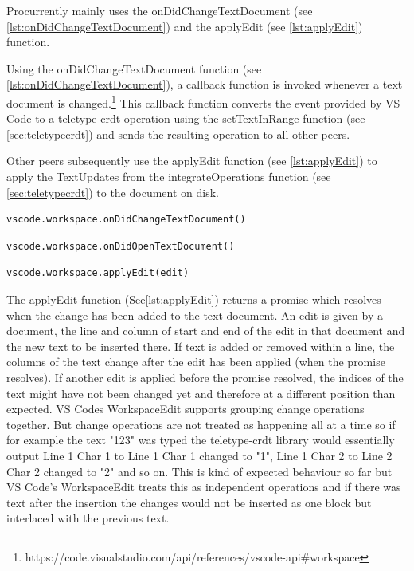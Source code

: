 Procurrently mainly uses the onDidChangeTextDocument (see \autoref{lst:onDidChangeTextDocument}) and the applyEdit (see \autoref{lst:applyEdit}) function. 

Using the onDidChangeTextDocument function (see \autoref{lst:onDidChangeTextDocument}), a callback function is invoked whenever a text document is changed.\footnote{https://code.visualstudio.com/api/references/vscode-api\#workspace} This callback function converts the event provided by VS Code to a teletype-crdt operation using the setTextInRange function (see \autoref{sec:teletypecrdt}) and sends the resulting operation to all other peers.

Other peers subsequently use the applyEdit function (see \autoref{lst:applyEdit}) to apply the TextUpdates from the integrateOperations function (see \autoref{sec:teletypecrdt}) to the document on disk.

\begin{lstlisting}[label={lst:onDidChangeTextDocument}, caption=VS Code API onDidChangeTextDocument]
vscode.workspace.onDidChangeTextDocument()
\end{lstlisting}

\begin{lstlisting}[label={lst:onDidOpenTextDocument}, caption=VS Code API onDidOpenTextDocument]
vscode.workspace.onDidOpenTextDocument()
\end{lstlisting}

\begin{lstlisting}[label={lst:applyEdit}, caption=VS Code API applyEdit]
vscode.workspace.applyEdit(edit)
\end{lstlisting}

The applyEdit function (See\autoref{lst:applyEdit}) returns a promise which resolves when the change has been added to the text document.
An edit is given by a document, the line and column of start and end of the edit in that document and the new text to be inserted there.
If text is added or removed within a line, the columns of the text change after the edit has been applied (when the promise resolves). If another edit is applied before the promise resolved, the indices of the text might have not been changed yet and therefore at a different position than expected. VS Codes WorkspaceEdit supports grouping change operations together. But change operations are not treated as happening all at a time so if for example the text "123" was typed the teletype-crdt library would essentially output Line 1 Char 1 to Line 1 Char 1 changed to "1", Line 1 Char 2 to Line 2 Char 2 changed to "2" and so on. This is kind of expected behaviour so far but VS Code's WorkspaceEdit treats this as independent operations and if there was text after the insertion the changes would not be inserted as one block but interlaced with the previous text. 

